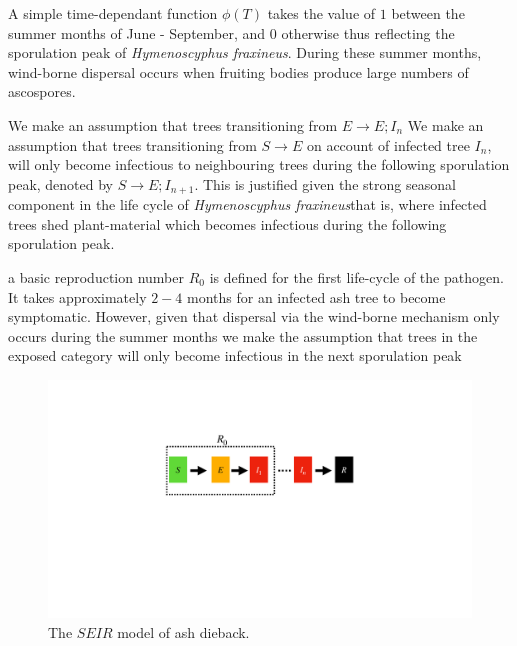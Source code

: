 A simple time-dependant function $\phi(T)$ takes the value of $1$ between the summer months of June - September, and $0$ otherwise thus reflecting the sporulation peak of \textit{Hymenoscyphus fraxineus}. During these summer months, wind-borne dispersal occurs when fruiting bodies produce large numbers of ascospores. 

We make an assumption that trees transitioning from $E\rightarrow E; I_{n}$
We make an assumption that trees transitioning from $S\rightarrow E$ on account of infected tree $I_{n}$, will only become infectious to neighbouring trees during the following sporulation peak, denoted by $S\rightarrow E; I_{n+1}$. This is justified given the strong seasonal component in the life cycle of \textit{Hymenoscyphus fraxineus}\textemdash that is, where infected trees shed plant-material which 
becomes infectious during the following sporulation peak. 

a basic reproduction number $R_0$ is defined for the first life-cycle of the pathogen.
It takes approximately $2-4$ months for an infected ash tree to become symptomatic. However, given that dispersal via the wind-borne mechanism only occurs during the summer months we make the assumption that trees in the exposed category will only become infectious in the next sporulation peak





\begin{figure}
    \centering
    \includegraphics[scale=0.30]{chapter5/figures_/fig4.pdf}
    \caption{The $SEIR$ model of ash dieback.}
    \label{fig:my_label}
\end{figure}

